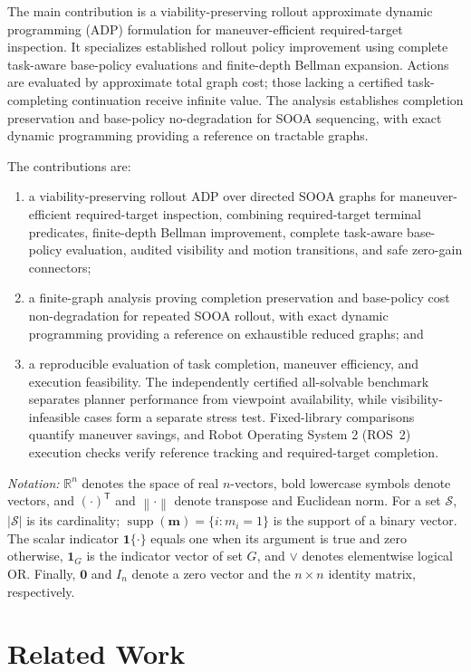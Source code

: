 \documentclass{IEEEtaes}
\newcommand{\norm}[1]{\left\lVert #1 \right\rVert}
\begin{document}
The main contribution is a viability-preserving rollout approximate dynamic programming (ADP) formulation for maneuver-efficient required-target inspection. It specializes established rollout policy improvement \cite{bertsekas1997combinatorial,bertsekas2020rollout} using complete task-aware base-policy evaluations and finite-depth Bellman expansion. Actions are evaluated by approximate total graph cost; those lacking a certified task-completing continuation receive infinite value. The analysis establishes completion preservation and base-policy no-degradation for SOOA sequencing, with exact dynamic programming providing a reference on tractable graphs.

The contributions are:
\begin{enumerate}
  \item a viability-preserving rollout ADP over directed SOOA graphs for maneuver-efficient required-target inspection, combining required-target terminal predicates, finite-depth Bellman improvement, complete task-aware base-policy evaluation, audited visibility and motion transitions, and safe zero-gain connectors;
  \item a finite-graph analysis proving completion preservation and base-policy cost non-degradation for repeated SOOA rollout, with exact dynamic programming providing a reference on exhaustible reduced graphs; and
  \item a reproducible evaluation of task completion, maneuver efficiency, and execution feasibility. The independently certified all-solvable benchmark separates planner performance from viewpoint availability, while visibility-infeasible cases form a separate stress test. Fixed-library comparisons quantify maneuver savings, and Robot Operating System 2 (ROS~2) execution checks verify reference tracking and required-target completion.
\end{enumerate}

\emph{Notation:} $\mathbb R^n$ denotes the space of real $n$-vectors, bold lowercase symbols denote vectors, and $(\cdot)^{\mathsf T}$ and $\norm{\cdot}$ denote transpose and Euclidean norm. For a set $\mathcal S$, $|\mathcal S|$ is its cardinality; $\operatorname{supp}(\mathbf m)=\{i:m_i=1\}$ is the support of a binary vector. The scalar indicator $\mathbf1\{\cdot\}$ equals one when its argument is true and zero otherwise, $\mathbf1_G$ is the indicator vector of set $G$, and $\lor$ denotes elementwise logical OR. Finally, $\mathbf0$ and $I_n$ denote a zero vector and the $n\times n$ identity matrix, respectively.
\section{Related Work}
\label{sec:related}
\end{document}
